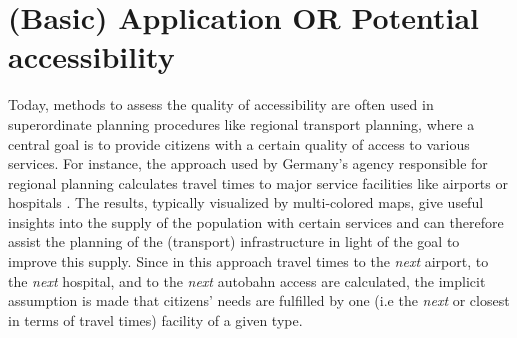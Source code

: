 


\section{(Basic) Application OR Potential accessibility} 
Today, methods to assess the quality of accessibility
are often used in superordinate planning procedures like regional transport planning, where a central goal is to provide 
citizens with a certain quality of access to various services. For instance, the approach used by Germany's agency 
responsible for regional planning calculates travel times to major service facilities like airports or hospitals \citep{BBSR20xxErreichbarkeitsmodell}. %
The results, typically visualized by multi-colored maps, give useful insights into the supply of the population with 
certain services and can therefore assist the planning of the (transport) infrastructure in light of the goal to improve 
this supply.
Since in this approach travel times to the \textit{next} airport, to the \textit{next} hospital, and to the \textit{next} 
autobahn access are calculated, the implicit assumption is made that citizens' needs are fulfilled by one (i.e the \textit{next} 
or closest in terms of travel times) facility of a given type.


